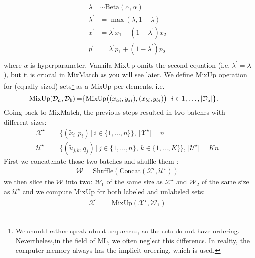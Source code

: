 \begin{enumerate}
\begin{align*}
                \lambda &\sim \text{Beta}(\alpha,\alpha) \\
                \lambda^\prime &= \max(\lambda,1-\lambda) \\
                x^\prime &= \lambda^\prime x_1 + (1-\lambda^\prime) x_2 \\
                p^\prime &= \lambda^\prime p_1 + (1-\lambda^\prime) p_2 \\
            \end{align*}
            where $\alpha$ is hyperparameter. Vannila MixUp omits the second equation (i.e. $\lambda^\prime = \lambda$), but it is crucial in MixMatch as you will
            see later. We define MixUp operation for (equally sized) sets\footnote{We should rather speak about sequences, as the sets do not have ordering. 
            Nevertheless,in the field of ML, we often neglect this difference. In reality, the computer memory always has the implicit ordering, which is used.} 
            as a MixUp per elements, i.e.
            \begin{equation*}
                \begin{split}
                    \text{MixUp}(\mathcal{D}_a,\mathcal{D}_b) = & \{\text{MixUp} \big{(} (x_{ai},y_{ai}),(x_{bi},y_{bi}) \big{)}\,|\,i \in {1,\dots,|\mathcal{D}_a|}  \}.
                \end{split}
            \end{equation*}
        Going back to MixMatch, the previous steps resulted in two batches with different sizes:
            \begin{align*}
                \mathcal{X}^\star &= \{ (\tilde{x}_i,p_i)\,|\, i \in \{1,\dots,n\}  \}, \, |\mathcal{X}^\star| = n \\
                \mathcal{U}^\star &= \{ (\tilde{u}_{j,k},q_j)\,|\, j \in \{1,\dots,n\},\,k \in \{1,\dots,K\}  \}, \, |\mathcal{U}^\star| = Kn 
            \end{align*}
        First we concatenate those two batches and shuffle them :
            \begin{align*}
                \mathcal{W} = \text{Shuffle}(\text{Concat}(\mathcal{X}^\star,\mathcal{U}^\star))
            \end{align*}
        we then slice the $\mathcal{W}$ into two: $\mathcal{W}_1$ of the same size as $\mathcal{X}^\star$ and $\mathcal{W}_2$ of the same size 
        as $\mathcal{U}^\star$ and we compute MixUp for both labeled and unlabeled sets:
        \begin{align*}
            \mathcal{X}^\prime &= \text{MixUp}(\mathcal{X}^\star,\mathcal{W}_1) \\

\end{align*}
\end{enumerate}
